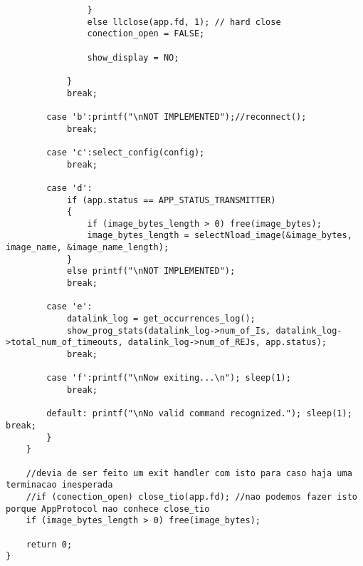 \begin{lstlisting}
				}
				else llclose(app.fd, 1); // hard close
				conection_open = FALSE;

				show_display = NO;
				
			}
			break;

		case 'b':printf("\nNOT IMPLEMENTED");//reconnect();
			break;

		case 'c':select_config(config);
			break;

		case 'd':
			if (app.status == APP_STATUS_TRANSMITTER)
			{
				if (image_bytes_length > 0) free(image_bytes);
				image_bytes_length = selectNload_image(&image_bytes, image_name, &image_name_length);
			}
			else printf("\nNOT IMPLEMENTED");
			break;

		case 'e':
			datalink_log = get_occurrences_log();
			show_prog_stats(datalink_log->num_of_Is, datalink_log->total_num_of_timeouts, datalink_log->num_of_REJs, app.status);
			break;

		case 'f':printf("\nNow exiting...\n"); sleep(1);
			break;

		default: printf("\nNo valid command recognized."); sleep(1); break;
		}
	}

	//devia de ser feito um exit handler com isto para caso haja uma terminacao inesperada
	//if (conection_open) close_tio(app.fd); //nao podemos fazer isto porque AppProtocol nao conhece close_tio
	if (image_bytes_length > 0) free(image_bytes);

	return 0;
}

\end{lstlisting}
